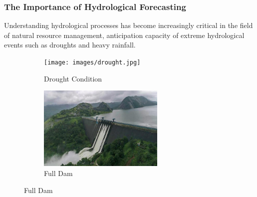 \begin{frame}
	\frametitle{The Importance of Hydrological Forecasting}
	\begin{block}{}
	Understanding hydrological processes has become increasingly critical in the field of natural resource management, anticipation capacity of extreme hydrological events such as droughts and heavy rainfall.
	\end{block}
	\begin{figure}
		\centering
		\begin{subfigure}[b]{0.45\textwidth}
			\centering
			\texttt{[image: images/drought.jpg]}
			\caption{Drought Condition}
		\end{subfigure}
		\hfill
		\begin{subfigure}[b]{0.45\textwidth}
			\centering
			\includegraphics[width=\textwidth, height=4cm]{images/full_dam.jpg}
			\caption{Full Dam}
		\end{subfigure}
	\end{figure}
	
\end{frame}

